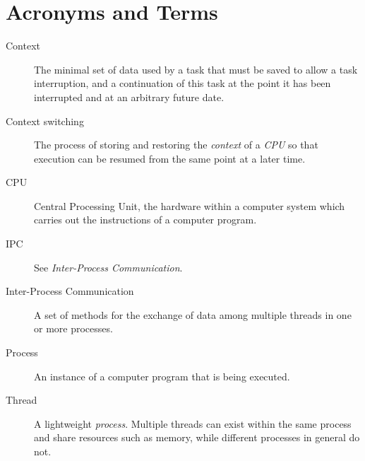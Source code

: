 \chapter{Acronyms and Terms}\label{appA}

\begin{description}
	\item[Context] The minimal set of data used by a task that must be saved
		to allow a task interruption, and a continuation of this task at the
		point it has been interrupted and at an arbitrary future date.
	\item[Context switching] The process of storing and restoring the
		\emph{context} of a \emph{CPU} so that execution can be resumed from
		the same point at a later time.
	\item[CPU] Central Processing Unit, the hardware within a computer system
		which carries out the instructions of a computer program.
	\item[IPC] See \emph{Inter-Process Communication}.
	\item[Inter-Process Communication] A set of methods for the exchange of
		data among multiple threads in one or more processes.
	\item[Process] An instance of a computer program that is being executed.
	\item[Thread] A lightweight \emph{process}. Multiple threads can exist
		within the same process and share resources such as memory, while
		different processes in general do not.
\end{description}

